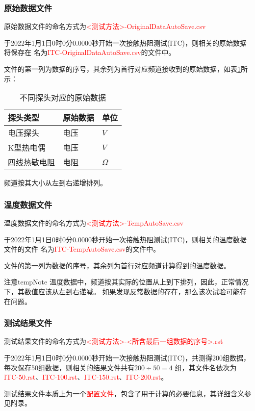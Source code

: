 \subsubsection*{原始数据文件}
原始数据文件的命名方式为\textcolor{red}{<测试方法>-OriginalDataAutoSave.csv}
\begin{example}
    于2022年1月1日0时0分0.0000秒开始一次接触热阻测试(ITC)，则相关的原始数据将保存在
    名为\textcolor{red}{ITC-OriginalDataAutoSave.csv}的文件中。
\end{example}
文件的第一列为数据的序号，其余列为首行对应频道接收到的原始数据，如表\ref{tab:originalData}所示：
\begin{table}[htbp]
    \centering
    \caption{ 不同探头对应的原始数据 \label{tab:originalData}}
    \begin{tabular}{@{}lll@{}}
        \toprule
        探头类型     & 原始数据 & 单位        \\ \midrule
        电压探头     & 电压     & $V $        \\
        K型热电偶    & 电压     & $V$         \\
        四线热敏电阻 & 电阻     & $\varOmega$ \\ \bottomrule
    \end{tabular}
\end{table}
频道按其大小从左到右递增排列。

\subsubsection*{温度数据文件}
温度数据文件的命名方式为\textcolor{red}{<测试方法>-TempAutoSave.csv}
\begin{example}
    于2022年1月1日0时0分0.0000秒开始一次接触热阻测试(ITC)，则相关的温度数据文件的文件
    名为\textcolor{red}{ITC-TempAutoSave.csv}的文件中。
\end{example}
文件的第一列为数据的序号，其余列为首行对应频道计算得到的温度数据。
\begin{tips}{注意}{tempNote}
    温度数据中，频道按其实际的位置从上到下排列，因此，正常情况下，其数值应该从左到右递减。
    如果发现反常数据的存在，那么该次试验可能存在问题。
\end{tips}

\subsubsection*{测试结果文件}
测试结果文件的命名方式为\textcolor{red}{<测试方法>-<所含最后一组数据的序号>.rst}
\begin{example}
    于2022年1月1日0时0分0.0000秒开始一次接触热阻测试(ITC)，共测得200组数据，每次保存50组数据，则相关的结果文件共有$200\div 50 = 4$
    组，其文件名依次为\textcolor{red}{ITC-50.rst}、\textcolor{red}{ITC-100.rst}、\textcolor{red}{ITC-150.rst}、\textcolor{red}{ITC-200.rst}。
\end{example}
测试结果文件本质上为一个\textcolor{red}{配置文件}，包含了用于计算的必要信息，其详细含义参见附录。

